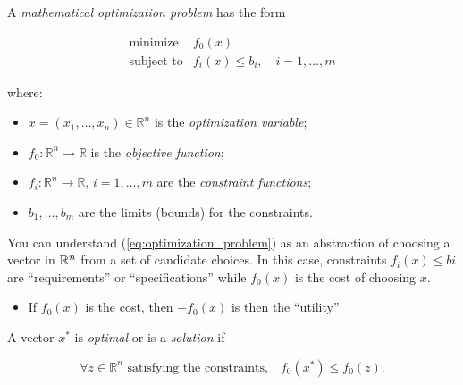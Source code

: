 


A \textit{mathematical optimization problem} has the form

\begin{equation}\label{eq:opt_problem}
  \begin{array}{rl} \text{minimize} & f_0(x) \\ \text{subject to} & f_i(x)\le b_i,\quad i=1,\ldots,m
  \end{array}
\end{equation}

where:

\begin{itemize}
\item $x=(x_1,\ldots,x_n)\in\mathbb R^n$ is the \textit{optimization variable};
\item $f_0:\mathbb R^n\to\mathbb R$ is the \textit{objective function};
\item $f_i:\mathbb R^n\to \mathbb R$, $i=1,\ldots,m$ are the \textit{constraint functions};
\item $b_1,...,b_m$ are the limits (bounds) for the constraints.
\end{itemize}

\begin{Fact}
  You can understand (\ref{eq:optimization_problem}) as an abstraction of choosing a vector in $\mathbb R^n$
  from a set of candidate choices. In this case, constraints $f_i(x)\le bi$ are ``requirements'' or ``specifications''
  while $f_0(x)$ is the cost of choosing $x$.

  \begin{itemize}
  \item If $f_0(x)$ is the cost, then $-f_0(x)$ is then the ``utility''
  \end{itemize}
\end{Fact}

\begin{Definition}
  A vector $x^*$ is \textit{optimal} or is a \textit{solution} if

  \begin{equation*}
    \forall z\in\mathbb R^n\text{ satisfying the constraints,}\quad f_0(x^*)\le f_0(z).
  \end{equation*}
\end{Definition}


